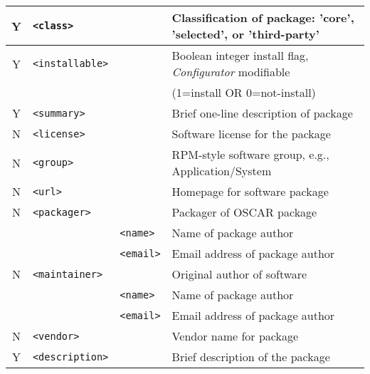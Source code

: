 \begin{table}[h!]
\begin{small}
\begin{center}
\begin{tabular}{|c|l|l|l|}
  Y & \verb|<class>|   
		&   
		& Classification of package: {\small 'core', 'selected', or  'third-party'}
		\\ \hline

  Y & \verb|<installable>|   
		&   
		& Boolean integer install flag, \emph{Configurator} modifiable 
		\\ 
    &
		&
		& (1=install OR 0=not-install)
		\\\hline

  Y & \verb|<summary>| 
		&   
		& Brief one-line description of package         
		\\ \hline

  N & \verb|<license>| 
		&   
		& Software license for the package              
		\\ \hline

  N & \verb|<group>|   
		&   
		& RPM-style software group, e.g., Application/System
		\\\hline

  N & \verb|<url>|     
		&   
		& Homepage for software package                 
		\\ \hline

  N & \verb|<packager>|
		&   
		& Packager of OSCAR package              
		\\\cline{3-4}
%
    & 
		& \verb|<name>|   
		& Name of package author                    
		\\\cline{3-4}
%
    & 
		& \verb|<email>|  
		& Email address of package author           
		\\\hline

  N & \verb|<maintainer>|
		& 
		& Original author of software            
		\\\cline{3-4}
%
    & 
		& \verb|<name>|   
		& Name of package author                    
		\\\cline{3-4}
%
    & 
		& \verb|<email>|  
		& Email address of package author           
		\\\hline

  N & \verb|<vendor>|
		& 
		& Vendor name for package
		\\\hline

  Y & \verb|<description>|
		&
		& Brief description of the package              
		\\ \hline


\end{tabular}
\end{center}
\end{small}
\end{table}
